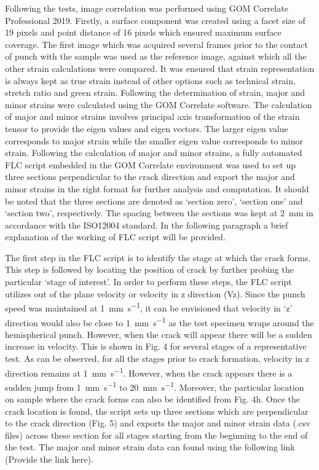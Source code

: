 \documentclass[11pt]{article} %
\begin{document}
Following the tests, image correlation was performed using GOM Correlate Professional 2019. Firstly, a surface component was created using a facet size of 19 pixels and point distance of 16 pixels which ensured maximum surface coverage. The first image which was acquired several frames prior to the contact of punch with the sample was used as the reference image, against which all the other strain calculations were compared. It was ensured that strain representation is always kept as true strain instead of other options such as technical strain, stretch ratio and green strain. Following the determination of strain, major and minor strains were calculated using the GOM Correlate software. The calculation of major and minor strains involves principal axis transformation of the strain tensor to provide the eigen values and eigen vectors. The larger eigen value corresponds to major strain while the smaller eigen value corresponds to minor strain. Following the calculation of major and minor strains, a fully automated FLC script embedded in the GOM Correlate environment was used to set up three sections perpendicular to the crack direction and export the major and minor strains in the right format for further analysis and computation. It should be noted that the three sections are denoted as ‘section zero’, ‘section one’ and ‘section two’, respectively. The spacing between the sections was kept at \SI{2}{\milli\meter} in accordance with the ISO12004 standard. In the following paragraph a brief explanation of the working of FLC script will be provided.  


The first step in the FLC script is to identify the stage at which the crack forms. This step is followed by locating the position of crack by further probing the particular ‘stage of interest’. In order to perform these steps, the FLC script utilizes out of the plane velocity or velocity in z direction (Vz). Since the punch speed was maintained at \SI{1}{\milli\meter\per\second}, it can be envisioned that velocity in ‘z’ direction would also be close to \SI{1}{\milli\meter\per\second} as the test specimen wraps around the hemispherical punch. However, when the crack will appear there will be a sudden increase in velocity. This is shown in Fig. 4 for several stages of a representative test. As can be observed, for all the stages prior to crack formation, velocity in z direction remains at \SI{1}{\milli\meter\per\second}. However, when the crack appears there is a sudden jump from \SI{1}{\milli\meter\per\second} to \SI{20}{\milli\meter\per\second}. Moreover, the particular location on sample where the crack forms can also be identified from Fig. 4h. Once the crack location is found, the script sets up three sections which are perpendicular to the crack direction (Fig. 5) and exports the major and minor strain data (.csv files) across these section for all stages starting from the beginning to the end of the test. The major and minor strain data can found using the following link (Provide the link here).  
\end{document}
